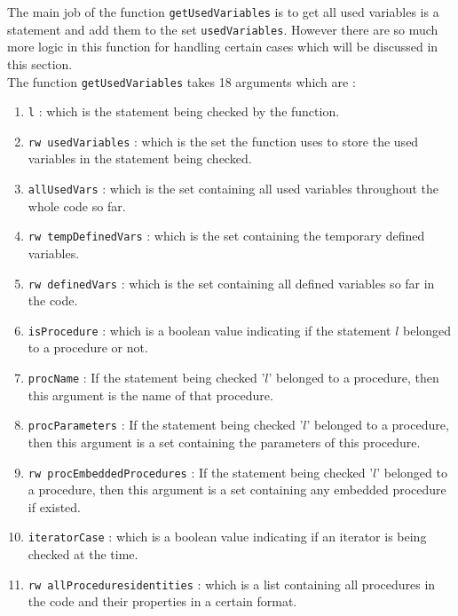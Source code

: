 \documentclass[11pt]{report}
\begin{document}
The main job of the function \texttt{getUsedVariables} is to get all used variables is a statement and add them to the set \texttt{usedVariables}. However there are so much more logic in this function for handling certain cases which will be discussed in this section.
\\

The function \texttt{getUsedVariables} takes 18 arguments which are :

\begin{enumerate}
\item \texttt{l} : which is the statement being checked by the function.

\item \texttt{rw usedVariables} : which is the set the function uses to store the used variables in the statement being checked.

\item \texttt{allUsedVars} : which is the set containing all used variables throughout the whole code so far.

\item \texttt{rw tempDefinedVars} : which is the set containing the temporary defined variables.

\item \texttt{rw definedVars} : which is the set containing all defined variables so far in the code.

\item \texttt{isProcedure} : which is a boolean value indicating if the statement $l$ belonged to a procedure or not.

\item \texttt{procName} : If the statement being checked '$l$' belonged to a procedure, then this argument is the name of that procedure.

\item \texttt{procParameters} : If the statement being checked '$l$' belonged to a procedure, then this argument is a set containing the parameters of this procedure.

\item \texttt{rw procEmbeddedProcedures} : If the statement being checked '$l$' belonged to a procedure, then this argument is a set containing any embedded procedure if existed.

\item \texttt{iteratorCase} : which is a boolean value indicating if an iterator is being checked at the time.

\item \texttt{rw allProceduresidentities} : which is a list containing all procedures in the code and their properties in a certain format.


\end{enumerate}
\end{document}
